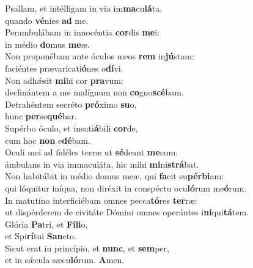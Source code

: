 \evenverse Psallam, et intélligam in via im\textbf{ma}cu\textbf{lá}ta,~\*\\
\evenverse quando \textbf{vé}nies \textbf{ad} me.\\
\oddverse Perambulábam in innocéntia \textbf{cor}dis \textbf{me}i:~\*\\
\oddverse in médio \textbf{do}mus \textbf{me}æ.\\
\evenverse Non proponébam ante óculos meos \textbf{rem} in\textbf{jú}stam:~\*\\
\evenverse faciéntes prævaricati\textbf{ó}nes o\textbf{dí}vi.\\
\oddverse Non adhǽsit \textbf{mi}hi cor \textbf{pra}vum:~\*\\
\oddverse declinántem a me malígnum non \textbf{co}gno\textbf{scé}bam.\\
\evenverse Detrahéntem secréto \textbf{pró}ximo \textbf{su}o,~\*\\
\evenverse hunc \textbf{per}se\textbf{qué}bar.\\
\oddverse Supérbo óculo, et insati\textbf{á}bili \textbf{cor}de,~\*\\
\oddverse cum hoc \textbf{non} e\textbf{dé}bam.\\
\evenverse Oculi mei ad fidéles terræ ut \textbf{sé}deant \textbf{me}cum:~\*\\
\evenverse ámbulans in via immaculáta, hic mihi \textbf{mi}ni\textbf{strá}bat.\\
\oddverse Non habitábit in médio domus meæ, qui \textbf{fa}cit su\textbf{pér}\textbf{bi}am:~\*\\
\oddverse qui lóquitur iníqua, non diréxit in conspéctu ocu\textbf{ló}rum me\textbf{ó}rum.\\
\evenverse In matutíno interficiébam omnes pecca\textbf{tó}res \textbf{ter}ræ:~\*\\
\evenverse ut dispérderem de civitáte Dómini omnes operántes i\textbf{ni}qui\textbf{tá}tem.\\
\oddverse Glória \textbf{Pa}tri, et \textbf{Fí}\textbf{li}o,~\*\\
\oddverse et Spi\textbf{rí}tui \textbf{San}cto.\\
\evenverse Sicut erat in princípio, et \textbf{nunc}, et \textbf{sem}per,~\*\\
\evenverse et in sǽcula sæcu\textbf{ló}rum. \textbf{A}men.\\
